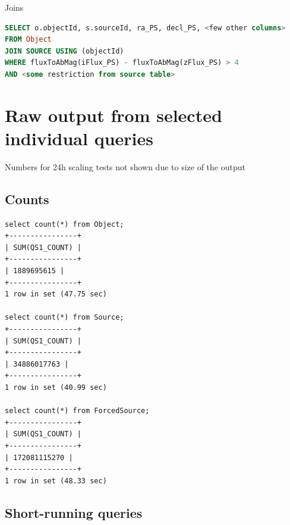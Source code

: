 \documentclass[DM,toc]{lsstdoc}
\begin{document}
Joins

\begin{lstlisting}[language=SQL]
SELECT o.objectId, s.sourceId, ra_PS, decl_PS, <few other columns>
FROM Object
JOIN SOURCE USING (objectId)
WHERE fluxToAbMag(iFlux_PS) - fluxToAbMag(zFlux_PS) > 4
AND <some restriction from source table>
\end{lstlisting}

\section{Raw output from selected individual
queries}\label{raw-output-from-selected-individual-queries}

Numbers for 24h scaling tests not shown due to size of the output

\subsection{Counts}\label{counts}

\begin{verbatim}
select count(*) from Object;
+----------------+
| SUM(QS1_COUNT) |
+----------------+
| 1889695615 |
+----------------+
1 row in set (47.75 sec)
 
select count(*) from Source;
+----------------+
| SUM(QS1_COUNT) |
+----------------+
| 34886017763 |
+----------------+
1 row in set (40.99 sec)

select count(*) from ForcedSource;
+----------------+
| SUM(QS1_COUNT) |
+----------------+
| 172081115270 |
+----------------+
1 row in set (48.33 sec)
\end{verbatim}

\subsection{Short-running queries}\label{short-running-queries}
\end{document}
